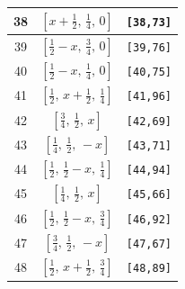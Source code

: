 \documentclass[fleqn,8pt]{jsarticle}
\begin{document}
\begin{longtable}{ccc}
38 & $\left[ x + \frac{1}{2},\, \frac{1}{4},\, 0 \right]$ & {\tt [38,73]} \\ \hline
39 & $\left[ \frac{1}{2} - x,\, \frac{3}{4},\, 0 \right]$ & {\tt [39,76]} \\ \hline
40 & $\left[ \frac{1}{2} - x,\, \frac{1}{4},\, 0 \right]$ & {\tt [40,75]} \\ \hline
41 & $\left[ \frac{1}{2},\, x + \frac{1}{2},\, \frac{1}{4} \right]$ & {\tt [41,96]} \\ \hline
42 & $\left[ \frac{3}{4},\, \frac{1}{2},\, x \right]$ & {\tt [42,69]} \\ \hline
43 & $\left[ \frac{1}{4},\, \frac{1}{2},\, - x \right]$ & {\tt [43,71]} \\ \hline
44 & $\left[ \frac{1}{2},\, \frac{1}{2} - x,\, \frac{1}{4} \right]$ & {\tt [44,94]} \\ \hline
45 & $\left[ \frac{1}{4},\, \frac{1}{2},\, x \right]$ & {\tt [45,66]} \\ \hline
46 & $\left[ \frac{1}{2},\, \frac{1}{2} - x,\, \frac{3}{4} \right]$ & {\tt [46,92]} \\ \hline
47 & $\left[ \frac{3}{4},\, \frac{1}{2},\, - x \right]$ & {\tt [47,67]} \\ \hline
48 & $\left[ \frac{1}{2},\, x + \frac{1}{2},\, \frac{3}{4} \right]$ & {\tt [48,89]} \\
\end{longtable}
\renewcommand{\arraystretch}{1.2}
\end{document}
